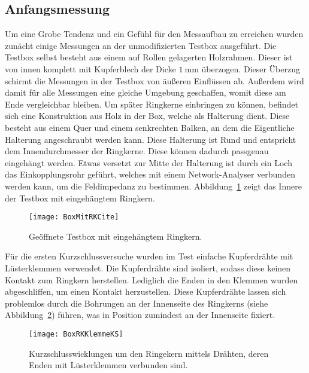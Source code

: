 \subsection{Anfangsmessung}
Um eine Grobe Tendenz und ein Gef\"uhl f\"ur den Messaufbau zu erreichen wurden zun\"acht einige Messungen an der unmodifizierten Testbox ausgef\"uhrt. Die Testbox selbst besteht aus einem auf Rollen gelagerten Holzrahmen. Dieser ist von innen komplett mit Kupferblech der Dicke $\SI{1}{\milli\meter}$ \"uberzogen. Dieser Überzug schirmt die Messungen in der Testbox von \"au\ss{}eren Einfl\"ussen ab. Au\ss{}erdem wird damit f\"ur alle Messungen eine gleiche Umgebung geschaffen, womit diese am Ende vergleichbar bleiben. Um sp\"ater Ringkerne einbringen zu k\"onnen, befindet sich eine Konstruktion aus Holz in der Box, welche als Halterung dient. Diese besteht aus einem Quer und einem senkrechten Balken, an dem die Eigentliche Halterung angeschraubt werden kann. Diese Halterung ist Rund und entspricht dem Innendurchmesser der Ringkerne. Diese k\"onnen dadurch passgenau eingeh\"angt werden. Etwas versetzt zur Mitte der Halterung ist durch ein Loch das Einkopplungsrohr gef\"uhrt, welches mit einem Network-Analyser verbunden werden kann, um die Feldimpedanz zu bestimmen. Abbildung~\ref{fig:leereBox} zeigt das Innere der Testbox mit eingeh\"angtem Ringkern.
\par
\begin{figure}[htb]
		\centering
		\texttt{[image: BoxMitRKCite]}
		\caption{Ge\"offnete Testbox mit eingeh\"angtem Ringkern.~\cite{harzheim2016modeling}}
		\label{fig:leereBox}
\end{figure}
F\"ur die ersten Kurzschlussversuche wurden im Test einfache Kupferdr\"ahte mit L\"usterklemmen verwendet. Die Kupferdr\"ahte sind isoliert, sodass diese keinen Kontakt zum Ringkern herstellen. Lediglich die Enden in den Klemmen wurden abgeschliffen, um einen Kontakt herzustellen. Diese Kupferdr\"ahte lassen sich problemlos durch die Bohrungen an der Innenseite des Ringkerns (siehe Abbildung~\ref{fig:innenKern}) f\"uhren, was in Position zumindest an der Innenseite fixiert.
\par
\begin{figure}[htb]
		\centering
		\texttt{[image: BoxRKKlemmeKS]}
		\caption{Kurzschlusswicklungen um den Ringekern mittels Dr\"ahten, deren Enden mit L\"usterklemmen verbunden sind.}
		\label{fig:innenKern}
\end{figure}





